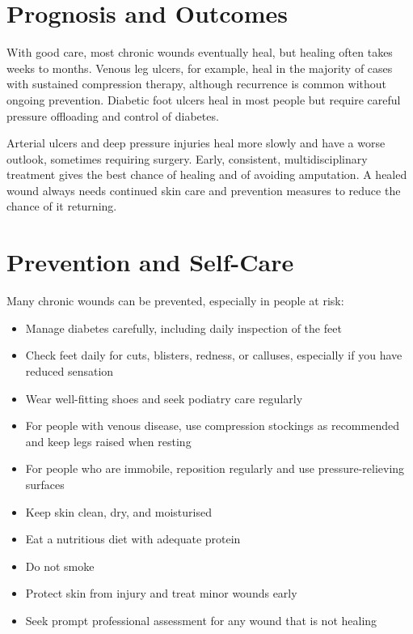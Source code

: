 \section*{Prognosis and Outcomes}
With good care, most chronic wounds eventually heal, but healing often takes weeks to months. Venous leg ulcers, for example, heal in the majority of cases with sustained compression therapy, although recurrence is common without ongoing prevention. Diabetic foot ulcers heal in most people but require careful pressure offloading and control of diabetes.

Arterial ulcers and deep pressure injuries heal more slowly and have a worse outlook, sometimes requiring surgery. Early, consistent, multidisciplinary treatment gives the best chance of healing and of avoiding amputation. A healed wound always needs continued skin care and prevention measures to reduce the chance of it returning.

\section*{Prevention and Self-Care}
Many chronic wounds can be prevented, especially in people at risk:

\begin{itemize}
    \item Manage diabetes carefully, including daily inspection of the feet
    \item Check feet daily for cuts, blisters, redness, or calluses, especially if you have reduced sensation
    \item Wear well-fitting shoes and seek podiatry care regularly
    \item For people with venous disease, use compression stockings as recommended and keep legs raised when resting
    \item For people who are immobile, reposition regularly and use pressure-relieving surfaces
    \item Keep skin clean, dry, and moisturised
    \item Eat a nutritious diet with adequate protein
    \item Do not smoke
    \item Protect skin from injury and treat minor wounds early
    \item Seek prompt professional assessment for any wound that is not healing
\end{itemize}
